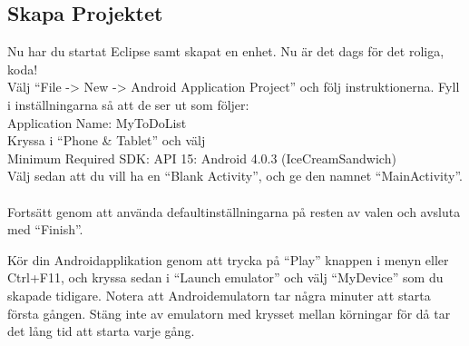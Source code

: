 \documentclass[11 pt, titlepage]{article} %
\begin{document}
\subsection{Skapa Projektet}
Nu har du startat Eclipse samt skapat en enhet.
Nu är det dags för det roliga, koda!
\\
Välj “File -> New -> Android Application Project” och följ instruktionerna. Fyll i inställningarna så att de ser ut som följer:\\
Application Name:  MyToDoList\\
Kryssa i ``Phone \& Tablet'' och välj \\
Minimum Required SDK:  API 15: Android 4.0.3 (IceCreamSandwich) \\
Välj sedan att du vill ha en ``Blank Activity'', och ge den namnet ``MainActivity''.\\
\\
Fortsätt genom att använda defaultinställningarna på resten av valen och avsluta med “Finish”.

Kör din Androidapplikation genom att trycka på “Play” knappen i menyn eller Ctrl+F11, och kryssa sedan i ``Launch emulator'' och välj ``MyDevice'' som du skapade tidigare.
Notera att Androidemulatorn tar några minuter att starta första gången.
Stäng inte av emulatorn med krysset mellan körningar för då tar det lång tid att starta varje gång.
\end{document}
